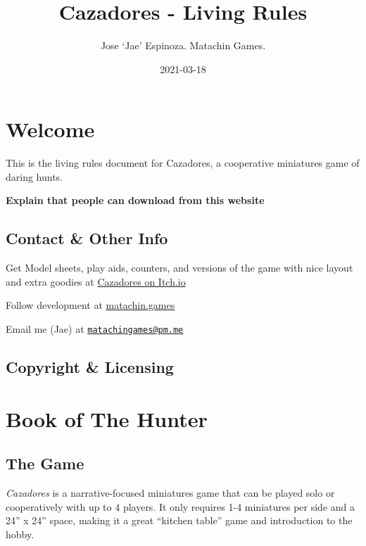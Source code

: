 \documentclass[
]{book}
\title{Cazadores - Living Rules}
\author{Jose `Jae' Espinoza. Matachin Games.}
\date{2021-03-18}
\begin{document}
\maketitle

{
\setcounter{tocdepth}{1}
\tableofcontents
}
\hypertarget{welcome}{%
\chapter{Welcome}\label{welcome}}

This is the living rules document for Cazadores, a cooperative miniatures game of daring hunts.

\textbf{Explain that people can download from this website}

\hypertarget{contact-other-info}{%
\section{Contact \& Other Info}\label{contact-other-info}}

Get Model sheets, play aids, counters, and versions of the game with nice layout and extra goodies at \href{https://matachingames.itch.io/cazadores}{Cazadores on Itch.io}

Follow development at \href{https://matachin.games}{matachin.games}

Email me (Jae) at \href{mailto:matachingames@pm.me}{\nolinkurl{matachingames@pm.me}}

\hypertarget{copyright-licensing}{%
\section{Copyright \& Licensing}\label{copyright-licensing}}

\hypertarget{hunterintro}{%
\chapter{Book of The Hunter}\label{hunterintro}}

\hypertarget{the-game}{%
\section{The Game}\label{the-game}}

\emph{Cazadores} is a narrative-focused miniatures game that can be played solo or cooperatively with up to 4 players. It only requires 1-4 miniatures per side and a 24'' x 24'' space, making it a great ``kitchen table'' game and introduction to the hobby.
\end{document}
